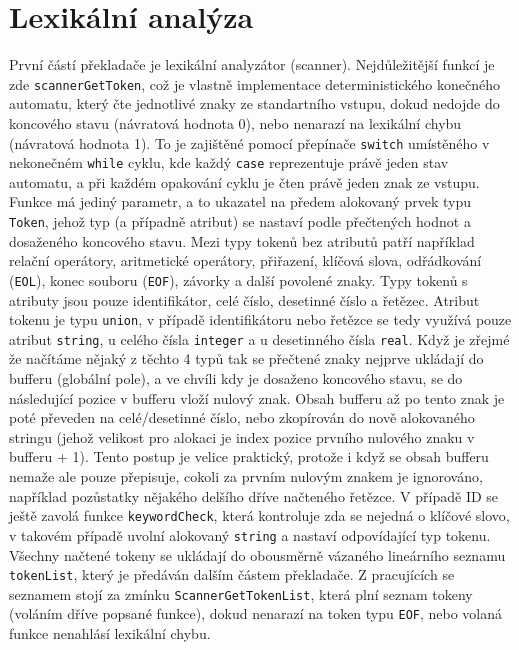 \documentclass[a4paper, 12pt]{article}
\begin{document}
\newpage

\section{Lexikální analýza}
První částí překladače je lexikální analyzátor (scanner). Nejdůležitější funkcí je zde \linebreak \verb|scannerGetToken|, což je vlastně implementace deterministického konečného automatu, který čte jednotlivé znaky ze standartního vstupu, dokud nedojde do koncového stavu (návratová hodnota 0), nebo nenarazí na lexikální chybu (návratová hodnota 1). To je zajištěné pomocí přepínače \verb|switch| umístěného v nekonečném \verb|while| cyklu, kde každý \verb|case| reprezentuje právě jeden stav automatu, a při každém opakování cyklu je čten právě jeden znak ze vstupu.
\newline
\newline
Funkce má jediný parametr, a to ukazatel na předem alokovaný prvek typu \verb|Token|, jehož typ (a případně atribut) se nastaví podle přečtených hodnot a dosaženého koncového stavu. Mezi typy tokenů bez atributů patří například relační operátory, aritmetické operátory, přiřazení, klíčová slova, odřádkování (\verb|EOL|), konec souboru (\verb|EOF|), závorky a další povolené znaky.
\newline
\newline
Typy tokenů s atributy jsou pouze identifikátor, celé číslo, desetinné číslo a řetězec. Atribut tokenu je typu \verb|union|, v případě identifikátoru nebo řetězce se tedy využívá pouze atribut \verb|string|, u celého čísla \verb|integer| a u desetinného čísla \verb|real|. Když je zřejmé že načítáme nějaký z těchto 4 typů tak se přečtené znaky nejprve ukládají do bufferu (globální pole), a ve chvíli kdy je dosaženo koncového stavu, se do následující pozice v bufferu vloží nulový znak. Obsah bufferu až po tento znak je poté převeden na celé/desetinné číslo, nebo zkopírován do nově alokovaného stringu (jehož velikost pro alokaci je index pozice prvního nulového znaku v bufferu + 1). Tento postup je velice praktický, protože i když se obsah bufferu nemaže ale pouze přepisuje, cokoli za prvním nulovým znakem je ignorováno, například pozůstatky nějakého delšího dříve načteného řetězce. V případě ID se ještě zavolá funkce \verb|keywordCheck|, která kontroluje zda se nejedná o klíčové slovo, v takovém případě uvolní alokovaný \verb|string| a nastaví odpovídající typ tokenu.
\newline
\newline
Všechny načtené tokeny se ukládají do obousměrně vázaného lineárního seznamu \verb|tokenList|, který je předáván dalším částem překladače. Z pracujících se seznamem stojí za zmínku \linebreak\verb|ScannerGetTokenList|, která plní seznam tokeny (voláním dříve popsané funkce), dokud nenarazí na token typu \verb|EOF|, nebo volaná funkce nenahlásí lexikální chybu. 
\end{document}

